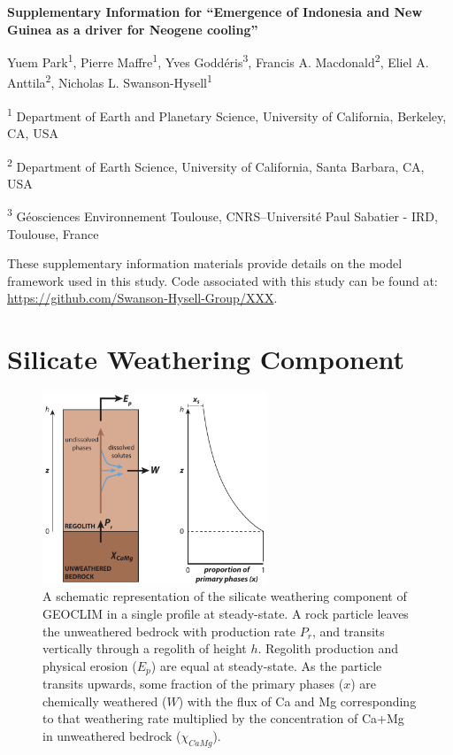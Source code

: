 \documentclass[11pt,letterpaper]{article}
\begin{document}
\begin{flushleft}
{\Large \textbf{Supplementary Information for ``Emergence of Indonesia and New Guinea as a driver for Neogene cooling''}}

Yuem Park\textsuperscript{1},
Pierre Maffre\textsuperscript{1},
Yves Godd\'eris\textsuperscript{3},
Francis A. Macdonald\textsuperscript{2},
Eliel A. Anttila\textsuperscript{2},
Nicholas L. Swanson-Hysell\textsuperscript{1}

\bigskip
\textsuperscript{1} Department of Earth and Planetary Science, University of California, Berkeley, CA, USA

\textsuperscript{2} Department of Earth Science, University of California, Santa Barbara, CA, USA

\textsuperscript{3} G\'eosciences Environnement Toulouse, CNRS--Universit\'e Paul Sabatier - IRD, Toulouse, France

\bigskip

\end{flushleft}

\linenumbers

These supplementary information materials provide details on the model framework used in this study. Code associated with this study can be found at: \url{https://github.com/Swanson-Hysell-Group/XXX}.

\section*{Silicate Weathering Component}

\begin{figure}
\begin{center}
	\includegraphics[width=0.6\textwidth]{../Figures/regolith_schematic.pdf}
	\caption{A schematic representation of the silicate weathering component of GEOCLIM in a single profile at steady-state. A rock particle leaves the unweathered bedrock with production rate $P_{r}$, and transits vertically through a regolith of height $h$. Regolith production and physical erosion ($E_{p}$) are equal at steady-state. As the particle transits upwards, some fraction of the primary phases ($x$) are chemically weathered ($W$) with the flux of Ca and Mg corresponding to that weathering rate multiplied by the concentration of Ca+Mg in unweathered bedrock ($\chi_{CaMg}$).}
	\label{fig:regolith_schematic}
\end{center}
\end{figure}
\end{document}
